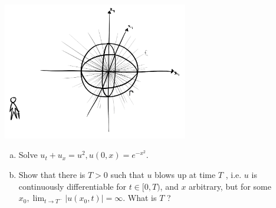 \documentclass{article}
\begin{document}
\begin{center}
    \includegraphics[height=6cm]{../images/explosion.jpeg}
\end{center}


\newpage
{} 
\begin{enumerate}[(a)]
    \item Solve $u_t + u_x = u^2, u(0, x) = e^{-x^2}$.
    \item Show that there is $T > 0$ such that $u$ blows up at time $T$ , i.e. $u$ is continuously differentiable
    for $t \in [0, T )$, and $x$ arbitrary, but for some $x_0, \lim_{t\to T^-}|u(x_0, t)|= \infty$. What is $T$ ?
\end{enumerate}
\tri
\hop
\solution
\end{document}

